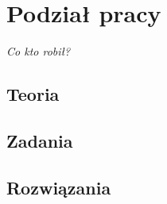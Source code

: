 \section{Podział pracy}

\begin{center}
\textit{Co kto robił?}
\end{center}



\subsection{Teoria}


\subsection{Zadania}


\subsection{Rozwiązania}